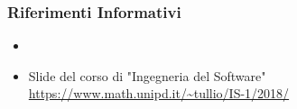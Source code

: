 		\subsubsection{Riferimenti Informativi}
			\begin{itemize}
			\item \PdQ
			\item Slide del corso di "Ingegneria del Software"\newline
			\url{https://www.math.unipd.it/~tullio/IS-1/2018/}
		\end{itemize}
